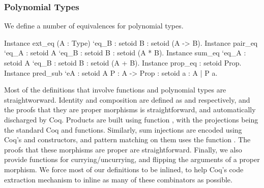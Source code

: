 \documentclass{llncs}
\begin{document}
\subsubsection{Polynomial Types}
We define a number of equivalences for polynomial types.
\begin{coqcode}
Instance ext_eq (A : Type) `{eq_B : setoid B} : setoid (A -> B).
Instance pair_eq `{eq_A : setoid A} `{eq_B : setoid B} : setoid (A * B).
Instance sum_eq `{eq_A : setoid A} `{eq_B : setoid B} : setoid (A + B).
Instance prop_eq : setoid Prop.
Instance pred_sub `{eA : setoid A} {P : A -> Prop} : setoid {a : A | P a}.
\end{coqcode}
Most of the definitions that involve functions and polynomial types are
straightworward.  Identity and composition are defined as 
 and  
respectively, and the proofs that they are proper morphisms is straightforward,
and automatically discharged by Coq. 
Products are built using function ,
with the projections being the standard Coq   and
 functions. Similarly, sum injections are encoded using
Coq's  and  constructors, and
pattern matching on them uses the function 
.
The proofs that these morphisms are proper are straightforward.  Finally, we
also provide functions for currying/uncurrying, and  flipping the arguments of
a proper morphism. We force most of our definitions to be inlined, to help
Coq's code extraction mechanism to inline as many of these combinators as
possible.
\end{document}
